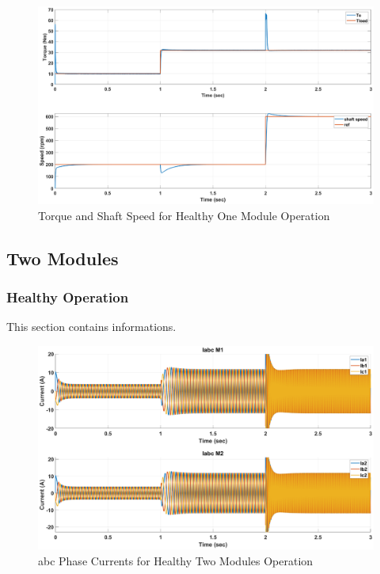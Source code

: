 \documentclass{article}
\begin{document}
\begin{figure}[H]
\centering
\includegraphics[scale=0.35]{SimulationResults/one_module/te_speed.eps}
\caption{Torque and Shaft Speed for Healthy One Module Operation}
\label{fig:TorqueShaftSpeedOneModuleHealthy}
\end{figure}

\subsection{Two Modules}
\subsubsection{Healthy Operation}
This section contains informations.

\begin{figure}[H]
\centering
\includegraphics[scale=0.35]{SimulationResults/two_modules/healthy/Iabc.eps}
\caption{abc Phase Currents for Healthy Two Modules Operation}
\label{fig:PhaseCurrentsAbcTwoModulesHealthy}
\end{figure}
\end{document}
